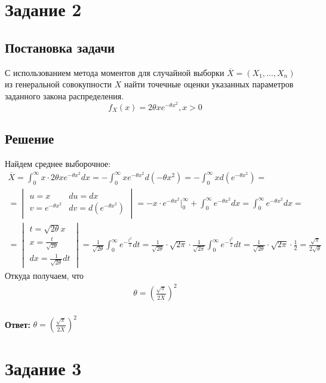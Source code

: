 \section*{Задание 2}
\subsection*{Постановка задачи}
С использованием метода моментов для случайной выборки $\overline{X} = (X_1, . . . , X_n)$ из генеральной
совокупности $X$ найти точечные оценки указанных параметров заданного закона распределения.
\begin{equation}
f_X(x) = 2\theta xe^{−\theta x^2}, x > 0
\end{equation}
\subsection*{Решение}
Найдем среднее выборочное:
\begin{eqnarray}
\overline{X} =  \int_0^\infty x \cdot 2\theta xe^{−\theta x^2}dx =  -\int_0^\infty xe^{−\theta x^2}d(-\theta x^2) = -\int_0^\infty x d(e^{-\theta x^2}) = \\ \nonumber =  \begin{vmatrix}
u = x  & du = dx \\ v = e^{-\theta x^2} & dv = d(e^{-\theta x^2}) 
\end{vmatrix} = -x \cdot e^{-\theta x^2} \bigg|_0^\infty + \int_0^\infty e^{-\theta x^2} dx	= \int_0^\infty e^{-\theta x^2} dx =  \\ \nonumber = \begin{vmatrix} t = \sqrt{2 \theta }x \\ x = \frac{t}{\sqrt{2\theta}} \\ dx = \frac{1}{\sqrt{2\theta}}dt\end{vmatrix} = \frac{1}{\sqrt{2\theta}} \int_0^\infty e^{-\frac{t^2}{2}}dt = \frac{1}{\sqrt{2\theta}} \cdot \sqrt{2\pi} \cdot \frac{1}{\sqrt{2\pi}} \int_0^\infty e^{-\frac{t^2}{2}}dt = \frac{1}{\sqrt{2\theta}} \cdot \sqrt{2\pi} \cdot \frac{1}{2} = \frac{\sqrt\pi}{2\sqrt\theta} 
\end{eqnarray}
Откуда получаем, что \begin{eqnarray}\theta = (\frac{\sqrt\pi}{2\overline{X}})^2\end{eqnarray} \\
\textbf{Ответ:} $\theta = (\frac{\sqrt\pi}{2\overline{X}})^2$

\section*{Задание 3}
